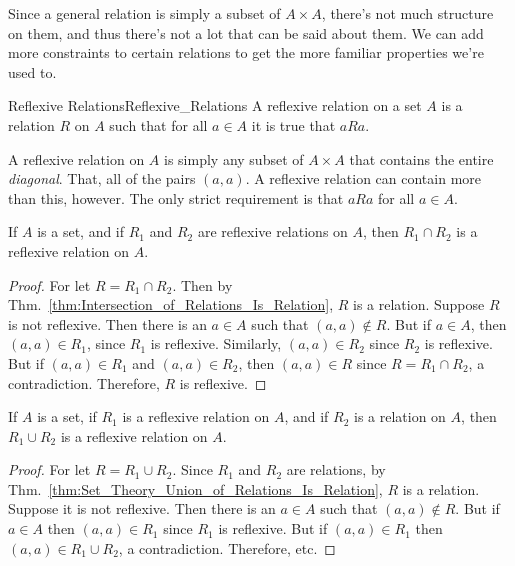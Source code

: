     Since a general relation is simply a subset of $A\times{A}$,
    there's not much structure on them, and thus there's not a lot
    that can be said about them. We can add more constraints to
    certain relations to get the more familiar properties
    we're used to.
    \begin{fdefinition}{Reflexive Relations}{Reflexive_Relations}
        A reflexive relation on a set $A$ is a
        relation $R$ on $A$ such that for all $a\in{A}$
        it is true that $aRa$.
    \end{fdefinition}
    A reflexive relation on $A$ is simply any subset of
    $A\times{A}$ that contains the entire \textit{diagonal}. That,
    all of the pairs $(a,a)$. A reflexive relation can contain more
    than this, however. The only strict requirement is that
    $aRa$ for all $a\in{A}$.
    \begin{theorem}
        If $A$ is a set, and if $R_{1}$ and $R_{2}$ are reflexive
        relations on $A$, then $R_{1}\cap{R}_{2}$ is a reflexive
        relation on $A$.
    \end{theorem}
    \begin{proof}
        For let $R=R_{1}\cap{R}_{2}$. Then by
        Thm.~\ref{thm:Intersection_of_Relations_Is_Relation}, $R$ is a relation.
        Suppose $R$ is not reflexive.
        Then there is an $a\in{A}$ such that $(a,a)\notin{R}$. But
        if $a\in{A}$, then $(a,a)\in{R}_{1}$, since $R_{1}$ is
        reflexive. Similarly, $(a,a)\in{R}_{2}$ since $R_{2}$ is
        reflexive. But if $(a,a)\in{R}_{1}$ and $(a,a)\in{R}_{2}$,
        then $(a,a)\in{R}$ since $R=R_{1}\cap{R}_{2}$, a
        contradiction. Therefore, $R$ is reflexive.
    \end{proof}
    \begin{theorem}
        If $A$ is a set, if $R_{1}$ is a reflexive relation on
        $A$, and if $R_{2}$ is a relation on $A$, then
        $R_{1}\cup{R}_{2}$ is a reflexive relation on $A$.
    \end{theorem}
    \begin{proof}
        For let $R=R_{1}\cup{R}_{2}$. Since $R_{1}$ and $R_{2}$ are
        relations, by
        Thm.~\ref{thm:Set_Theory_Union_of_Relations_Is_Relation},
        $R$ is a relation. Suppose it is not reflexive.
        Then there is an $a\in{A}$ such that
        $(a,a)\notin{R}$. But if $a\in{A}$ then $(a,a)\in{R}_{1}$
        since $R_{1}$ is reflexive. But if $(a,a)\in{R}_{1}$ then
        $(a,a)\in{R}_{1}\cup{R}_{2}$, a contradiction.
        Therefore, etc.
    \end{proof}
